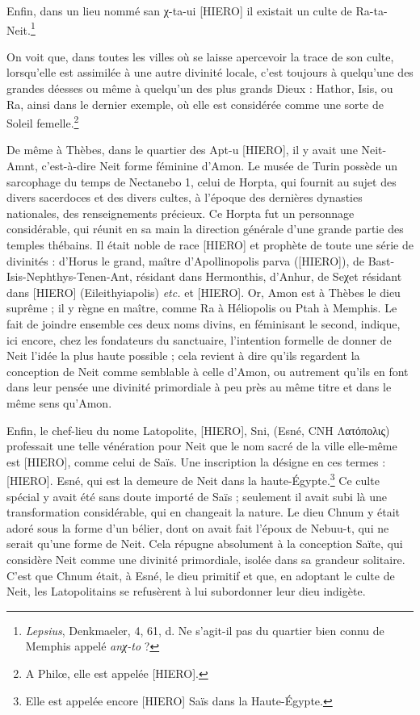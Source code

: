 \documentclass[a4paper, 11pt, oneside]{article}
\begin{document}
Enfin, dans un lieu nommé san χ-ta-ui [HIERO] il existait un culte de Ra-ta-Neit.\footnote{\emph{Lepsius}, Denkmaeler, 4, 61, d. Ne s'agit-il pas du quartier bien connu de Memphis appelé \emph{anχ-to} ?}

On voit que, dans toutes les villes où se laisse apercevoir la trace de son culte, lorsqu'elle est assimilée à une autre divinité locale, c'est toujours à quelqu'une des grandes déesses ou même à quelqu'un des plus grands Dieux : Hathor, Isis, ou Ra, ainsi dans le dernier exemple, où elle est considérée comme une sorte de Soleil femelle.\footnote{A Philœ, elle est appelée [HIERO].}

De même à Thèbes, dans le quartier des Apt-u [HIERO], il y avait une Neit-Amnt, c'est-à-dire Neit forme féminine d'Amon. Le musée de Turin possède un sarcophage du temps de Nectanebo 1, celui de Horpta, qui fournit au sujet des divers sacerdoces et des divers cultes, à l'époque des dernières dynasties nationales, des renseignements précieux. Ce Horpta fut un personnage considérable, qui réunit en sa main la direction générale d'une grande partie des temples thébains. Il était noble de race [HIERO] et prophète de toute une série de divinités : d'Horus le grand, maître d'Apollinopolis parva ([HIERO]), de Bast-Isis-Nephthys-Tenen-Ant, résidant dans Hermonthis, d'Anhur, de Seχet résidant dans [HIERO] (Eileithyiapolis) \emph{etc.} et [HIERO]. Or, Amon est à Thèbes le dieu suprême ; il y règne en maître, comme Ra à Héliopolis ou Ptah à Memphis. Le fait de joindre ensemble ces deux noms divins, en féminisant le second, indique, ici encore, chez les fondateurs du sanctuaire, l'intention formelle de donner de Neit l'idée la plus haute possible ; cela revient à dire qu'ils regardent la conception de Neit comme semblable à celle d'Amon, ou autrement qu'ils en font dans leur pensée une divinité primordiale à peu près au même titre et dans le même sens qu'Amon.

Enfin, le chef-lieu du nome Latopolite, [HIERO], Sni, (Esné, CNH Λατόπολις) professait une telle vénération pour Neit que le nom sacré de la ville elle-même est [HIERO], comme celui de Saïs. Une inscription la désigne en ces termes : [HIERO]. Esné, qui est la demeure de Neit dans la haute-Égypte.\footnote{Elle est appelée encore [HIERO] Saïs dans la Haute-Égypte.} Ce culte spécial y avait été sans doute importé de Saïs ; seulement il avait subi là une transformation considérable, qui en changeait la nature. Le dieu Chnum y était adoré sous la forme d'un bélier, dont on avait fait l'époux de Nebuu-t, qui ne serait qu'une forme de Neit. Cela répugne absolument à la conception Saïte, qui considère Neit comme une divinité primordiale, isolée dans sa grandeur solitaire. C'est que Chnum était, à Esné, le dieu primitif et que, en adoptant le culte de Neit, les Latopolitains se refusèrent à lui subordonner leur dieu indigète.
\end{document}
